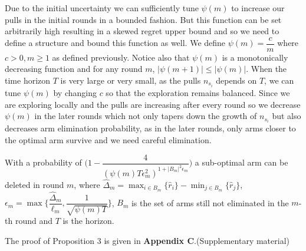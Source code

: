 \begin{remark}
	Due to the initial uncertainty we can sufficiently tune $\psi(m)$ to increase our pulls in the initial rounds in a bounded fashion. But this function can be set arbitrarily high resulting in a skewed regret upper bound and so we need to define a structure and bound this function as well. We define $\psi(m)=\dfrac{c}{m}$ where $c>0, m\geq 1$ as defined previously. Notice also that $\psi(m)$ is a monotonically decreasing function and for any round $m$, $|\psi(m+1)|\leq |\psi(m)|$. 
When the time horizon $T$ is very large or very small, as the pulls $n_{s_{i}}$ depends on $T$, we can tune $\psi(m)$ by changing $c$ so that the exploration remains balanced. Since we are exploring locally and the pulls are increasing after every round so we decrease $\psi(m)$ in the later rounds which not only tapers down the growth of $n_{s_{i}}$ but also decreases arm elimination probability, as in the later rounds, only arms closer to the optimal arm survive and we need careful elimination.
\end{remark}
	
	
	

\begin{proposition}
With a probability of $\bigg(1-\dfrac{4}{(\psi(m)T\epsilon_{m}^{2})^{1+|B_{m}|^{2}\epsilon_{m}}}\bigg)$ a sub-optimal arm can be deleted in round $m$, where $\hat{\Delta}_{m}=\max_{i\in B_{m}}{\lbrace\hat{r}_{i}\rbrace}-\min_{j\in B_{m}}{\lbrace\hat{r}_{j}\rbrace}$,  $\epsilon_{m}=\max{\bigg\lbrace\dfrac{\hat{\Delta}_{m}}{\ell_{m}}, \dfrac{1}{\sqrt{\psi{(m)T}}}\bigg\rbrace}$, $B_{m}$ is the set of arms still not eliminated in the $m$-th round and $T$ is the horizon.
\end{proposition}

	The proof of Proposition 3 is given in \textbf{Appendix C}.(Supplementary material)

